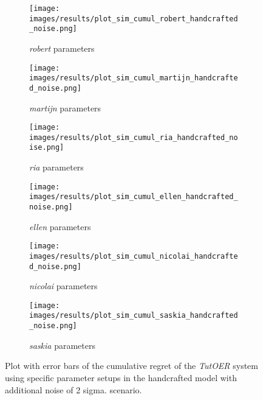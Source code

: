 \begin{figure}[ht]
	\begin{subfigure}{0.48\linewidth}
	\centering
	\texttt{[image: images/results/plot\_sim\_cumul\_robert\_handcrafted\_noise.png]}
	\caption{\emph{robert} parameters}
	\label{fig:cumul_handcrafted_noise_robert}
	\end{subfigure}
	\hfill
	\begin{subfigure}{0.48\linewidth}
	\centering
	\texttt{[image: images/results/plot\_sim\_cumul\_martijn\_handcrafted\_noise.png]}
	\caption{\emph{martijn} parameters}
	\label{fig:cumul_handcrafted_noise_martijn}
	\end{subfigure}
	\begin{subfigure}{0.48\linewidth}
	\centering
	\texttt{[image: images/results/plot\_sim\_cumul\_ria\_handcrafted\_noise.png]}
	\caption{\emph{ria} parameters}
	\label{fig:cumul_handcrafted_noise_ria}
	\end{subfigure}
	\hfill
	\begin{subfigure}{0.48\linewidth}
	\centering
	\texttt{[image: images/results/plot\_sim\_cumul\_ellen\_handcrafted\_noise.png]}
	\caption{\emph{ellen} parameters}
	\label{fig:cumul_handcrafted_noise_ellen}
	\end{subfigure}
	\begin{subfigure}{0.48\linewidth}
	\centering
	\texttt{[image: images/results/plot\_sim\_cumul\_nicolai\_handcrafted\_noise.png]}
	\caption{\emph{nicolai} parameters}
	\label{fig:cumul_handcrafted_noise_nicolai}
	\end{subfigure}
	\hfill
	\begin{subfigure}{0.48\linewidth}
	\centering
	\texttt{[image: images/results/plot\_sim\_cumul\_saskia\_handcrafted\_noise.png]}
	\caption{\emph{saskia} parameters}
	\label{fig:cumul_handcrafted_noise_saskia}
	\end{subfigure}
	\label{fig:cumul_handcrafted_noise_individuals2}
	\caption{Plot with error bars of the cumulative regret of the \emph{TutOER}
	system using specific parameter setups in the handcrafted model with
	additional noise of 2 sigma.
	scenario.}
\end{figure}

